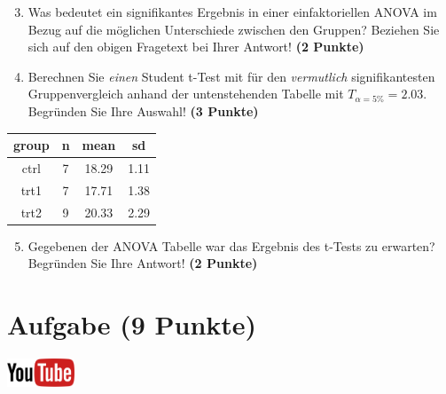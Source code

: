 \documentclass[a4paper, 10pt]{scrartcl}\usepackage[]{graphicx}\usepackage[]{xcolor}
\newenvironment{knitrout}{}{} %
\begin{document}
\vspace{1Ex}

\begin{enumerate}
  \setcounter{enumi}{2}
\item Was bedeutet ein signifikantes Ergebnis in einer einfaktoriellen
  ANOVA im Bezug auf die m{\"o}glichen Unterschiede zwischen den Gruppen? Beziehen Sie sich auf den obigen Fragetext bei Ihrer Antwort!
  \textbf{(2 Punkte)}
\item Berechnen Sie \textit{einen} Student t-Test mit f{\"u}r den \textit{vermutlich}
  signifikantesten Gruppenvergleich anhand der untenstehenden Tabelle mit
  $T_{\alpha = 5\%} = 2.03$. Begr{\"u}nden Sie Ihre Auswahl! \textbf{(3 Punkte)}
\end{enumerate}

\begin{knitrout}
\color{fgcolor}\begin{table}[!h]
\centering
\begin{tabular}{cccc}
\toprule
group & n & mean & sd\\
\midrule
ctrl & 7 & 18.29 & 1.11\\
trt1 & 7 & 17.71 & 1.38\\
trt2 & 9 & 20.33 & 2.29\\
\bottomrule
\end{tabular}
\end{table}

\end{knitrout}

\begin{enumerate}
  \setcounter{enumi}{4}
\item Gegebenen der ANOVA Tabelle war das Ergebnis des t-Tests zu erwarten?
  Begr{\"u}nden Sie Ihre Antwort! \textbf{(2 Punkte)}
\end{enumerate}

 
\clearpage

\section{Aufgabe \hfill (9 Punkte)}

\hfill\href{https://youtu.be/d4CFR2MKX7I}{\includegraphics[width =
  2cm]{img/youtube}}\\[1Ex]
\end{document}
